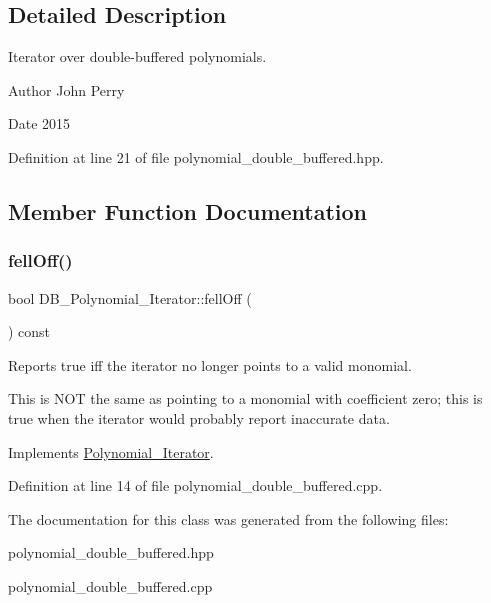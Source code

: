 \subsection{Detailed Description}
Iterator over double-\/buffered polynomials. 

\begin{DoxyAuthor}{Author}
John Perry 
\end{DoxyAuthor}
\begin{DoxyDate}{Date}
2015 
\end{DoxyDate}


Definition at line 21 of file polynomial\+\_\+double\+\_\+buffered.\+hpp.



\subsection{Member Function Documentation}
\mbox{\label{class_d_b___polynomial___iterator_a5d81456e74a757cf6769ce17d37b82ce}} 
\subsubsection{\texorpdfstring{fell\+Off()}{fellOff()}}
{\footnotesize\ttfamily bool D\+B\+\_\+\+Polynomial\+\_\+\+Iterator\+::fell\+Off (\begin{DoxyParamCaption}{ }\end{DoxyParamCaption}) const\hspace{0.3cm}{\ttfamily [virtual]}}



Reports true iff the iterator no longer points to a valid monomial. 

This is N\+OT the same as pointing to a monomial with coefficient zero; this is true when the iterator would probably report inaccurate data. 

Implements \hyperlink{class_polynomial___iterator_ac571e120134088d6067718bbad513e2d}{Polynomial\+\_\+\+Iterator}.



Definition at line 14 of file polynomial\+\_\+double\+\_\+buffered.\+cpp.



The documentation for this class was generated from the following files\+:\begin{DoxyCompactItemize}
\item 
polynomial\+\_\+double\+\_\+buffered.\+hpp\item 
polynomial\+\_\+double\+\_\+buffered.\+cpp\end{DoxyCompactItemize}

